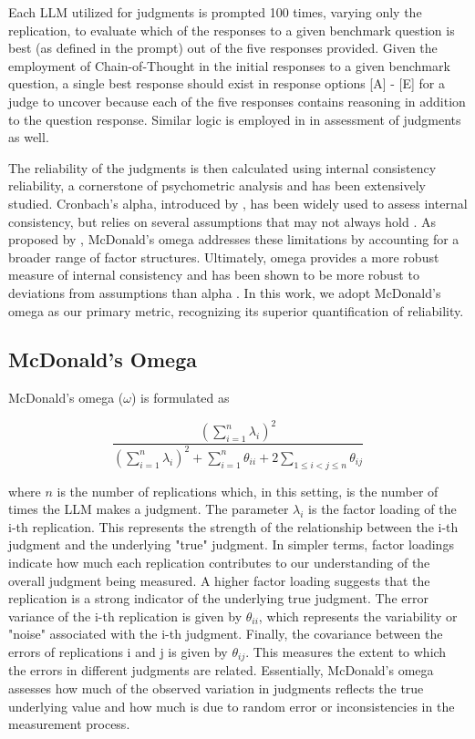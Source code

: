 \documentclass[11pt]{article}
\begin{document}
Each LLM utilized for judgments is prompted 100 times, varying only the replication, to evaluate which of the responses to a given benchmark question is best (as defined in the prompt) out of the five responses provided. Given the employment of Chain-of-Thought in the initial responses to a given benchmark question, a single best response should exist in response options [A] - [E] for a judge to uncover because each of the five responses contains reasoning in addition to the question response. Similar logic is employed in \citet{zheng2023judging} in assessment of judgments as well.

The reliability of the judgments is then calculated using internal consistency reliability, a cornerstone of psychometric analysis and has been extensively studied. Cronbach's alpha, introduced by \citet{cronbach1951coefficient}, has been widely used to assess internal consistency, but relies on several assumptions that may not always hold \citep{malkewitz2023estimating, agbo2010cronbach}. As proposed by \citet{mcdonald2013test}, McDonald's omega addresses these limitations by accounting for a broader range of factor structures. Ultimately, omega provides a more robust measure of internal consistency and has been shown to be more robust to deviations from assumptions than alpha \citep{stensen2022internal}. In this work, we adopt McDonald's omega as our primary metric, recognizing its superior quantification of reliability. 

\subsection{McDonald's Omega}

McDonald's omega ($\omega$) is formulated as 

\begin{equation*}
    \dfrac{\left(\sum_{i=1}^{n}\lambda_i\right)^2}{\left(\sum_{i=1}^{n}\lambda_i\right)^2 + \sum_{i=1}^{n}\theta_{ii}+2\sum_{1\le i < j \le n}\theta_{ij}}
\end{equation*}

where $n$ is the number of replications which, in this setting, is the number of times the LLM makes a judgment. The parameter $\lambda_i$ is the factor loading of the i-th replication. This represents the strength of the relationship between the i-th judgment and the underlying "true" judgment. In simpler terms, factor loadings indicate how much each replication contributes to our understanding of the overall judgment being measured. A higher factor loading suggests that the replication is a strong indicator of the underlying true judgment. The error variance of the i-th replication is given by $\theta_{ii}$, which represents the variability or "noise" associated with the i-th judgment. Finally, the covariance between the errors of replications i and j is given by $\theta_{ij}$. This measures the extent to which the errors in different judgments are related. Essentially, McDonald's omega assesses how much of the observed variation in judgments reflects the true underlying value and how much is due to random error or inconsistencies in the measurement process.
\end{document}
